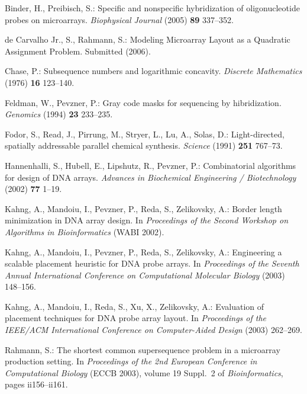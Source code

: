 \documentclass{llncs}
\begin{document}
\begin{thebibliography}{5}

Binder, H., Preibisch, S.:
Specific and nonspecific hybridization of oligonucleotide probes on microarrays.
{\it Biophysical Journal} (2005) {\bf 89} 337--352.

de Carvalho Jr., S., Rahmann, S.:
Modeling Microarray Layout as a Quadratic Assignment Problem.
Submitted (2006).

Chase, P.:
Subsequence numbers and logarithmic concavity.
{\it Discrete Mathematics} (1976) {\bf 16} 123--140.

Feldman, W., Pevzner, P.:
Gray code masks for sequencing by hibridization.
{\it Genomics} (1994) {\bf 23} 233--235.

Fodor, S., Read, J., Pirrung, M., Stryer, L., Lu, A., Solas, D.:
Light-directed, spatially addressable parallel chemical synthesis.
{\it Science} (1991) {\bf 251} 767--73.

Hannenhalli, S., Hubell, E., Lipshutz, R., Pevzner, P.:
Combinatorial algorithms for design of DNA arrays.
{\it Advances in Biochemical Engineering / Biotechnology} (2002) {\bf 77} 1--19.

Kahng, A., Mandoiu, I., Pevzner, P., Reda, S., Zelikovsky, A.:
Border length minimization in DNA array design.
In {\it Proceedings of the Second Workshop on Algorithms in Bioinformatics} (WABI 2002).

Kahng, A., Mandoiu, I., Pevzner, P., Reda, S., Zelikovsky, A.:
Engineering a scalable placement heuristic for DNA probe arrays.
In {\it Proceedings of the Seventh Annual International Conference on Computational Molecular Biology} (2003) 148--156.

Kahng, A., Mandoiu, I., Reda, S., Xu, X., Zelikovsky, A.:
Evaluation of placement techniques for DNA probe array layout.
In {\it Proceedings of the IEEE/ACM International Conference on Computer-Aided Design}
(2003) 262--269.

Rahmann, S.:
The shortest common supersequence problem in a microarray production setting.
In {\it Proceedings of the 2nd European Conference in Computational Biology}
({ECCB} 2003), volume 19 Suppl.~2 of {\it Bioinformatics}, pages ii156--ii161.

\end{thebibliography}
\end{document}
